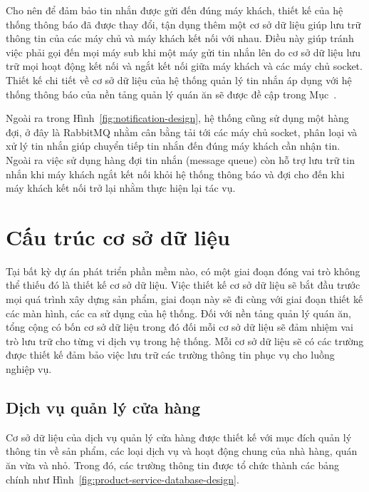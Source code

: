 Cho nên để đảm bảo tin nhắn được gửi đến đúng máy khách, thiết kế của hệ thống thông báo đã được thay đổi, tận dụng thêm một cơ sở dữ liệu giúp lưu trữ thông tin của các máy chủ và máy khách kết nối với nhau.
Điều này giúp tránh việc phải gọi đến mọi máy sub khi một máy gửi tin nhắn lên do cơ sở dữ liệu lưu trữ mọi hoạt động kết nối và ngắt kết nối giữa máy khách và các máy chủ socket.
Thiết kế chi tiết về cơ sở dữ liệu của hệ thống quản lý tin nhắn áp dụng với hệ thống thông báo của nền tảng quản lý quán ăn sẽ được đề cập trong Mục~.

Ngoài ra trong Hình~\ref{fig:notification-design}, hệ thống cũng sử dụng một hàng đợi, ở đây là RabbitMQ nhằm cân bằng tải tới các máy chủ socket, phân loại và xử lý tin nhắn giúp chuyển tiếp tin nhắn đến đúng máy khách cần nhận tin.
Ngoài ra việc sử dụng hàng đợi tin nhắn (message queue) còn hỗ trợ lưu trữ tin nhắn khi máy khách ngắt kết nối khỏi hệ thống thông báo và đợi cho đến khi máy khách kết nối trở lại nhằm thực hiện lại tác vụ.

\section{Cấu trúc cơ sở dữ liệu} \label{sec:database-design}
Tại bất kỳ dự án phát triển phần mềm nào, có một giai đoạn đóng vai trò không thể thiếu đó là thiết kế cơ sở dữ liệu.
Việc thiết kế cơ sở dữ liệu sẽ bắt đầu trước mọi quá trình xây dựng sản phẩm, giai đoạn này sẽ đi cùng với giai đoạn thiết kế các màn hình, các ca sử dụng của hệ thống.
Đối với nền tảng quản lý quán ăn, tổng cộng có bốn cơ sở dữ liệu trong đó đối mỗi cơ sở dữ liệu sẽ đảm nhiệm vai trò lưu trữ cho từng vi dịch vụ trong hệ thống.
Mỗi cơ sở dữ liệu sẽ có các trường được thiết kế đảm bảo việc lưu trữ các trường thông tin phục vụ cho luồng nghiệp vụ.
\subsection{Dịch vụ quản lý cửa hàng}
Cơ sở dữ liệu của dịch vụ quản lý cửa hàng được thiết kế với mục đích quản lý thông tin về sản phẩm, các loại dịch vụ và hoạt động chung của nhà hàng, quán ăn vừa và nhỏ.
Trong đó, các trường thông tin được tổ chức thành các bảng chính như Hình~\ref{fig:product-service-database-design}.

